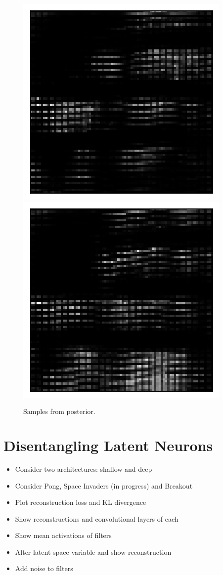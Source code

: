 \begin{figure}[h!]
\begin{multicols}{4}
    \includegraphics[scale=0.4]{figures/results/latent_image/beta_1_posterior_sample_5.png}
    \includegraphics[scale=0.4]{figures/results/latent_image/beta_1_posterior_sample_10.png}
\end{multicols}
\caption{Samples from posterior.}
\label{fig:latent_image_originals_posterior_samples}
\end{figure}


%
%
%
%
%
\section{Disentangling Latent Neurons}
\begin{itemize}
\item Consider two architectures: shallow and deep
\item Consider Pong, Space Invaders (in progress) and Breakout
\item Plot reconstruction loss and KL divergence
\item Show reconstructions and convolutional layers of each
\item Show mean activations of filters
\item Alter latent space variable and show reconstruction
\item Add noise to filters
\end{itemize}


